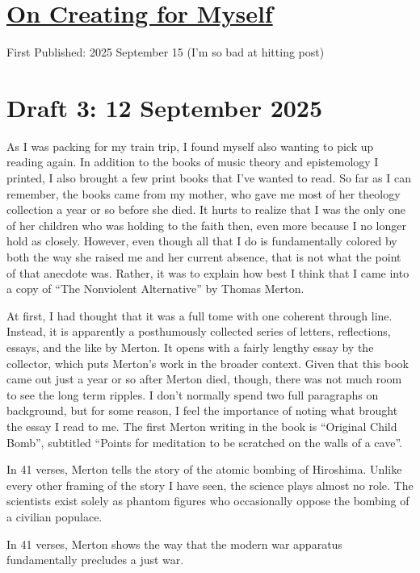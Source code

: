 \documentclass[12pt]{article}
\newcommand{\say}[1]{``#1''}
\renewcommand{\,}{\textsuperscript{,}}
\begin{document}
  
\doublespacing  
\section{\href{creating-for-myself.html}{On Creating for Myself}}  
First Published: 2025 September 15 (I'm so bad at hitting post)

\section{Draft 3: 12 September 2025}

As I was packing for my train trip, I found myself also wanting to pick up reading again.
In addition to the books of music theory and epistemology I printed, I also brought a few print books that I've wanted to read.
So far as I can remember, the books came from my mother, who gave me most of her theology collection a year or so before she died.
It hurts to realize that I was the only one of her children who was holding to the faith then, even more because I no longer hold as closely.
However, even though all that I do is fundamentally colored by both the way she raised me and her current absence, that is not what the point of that anecdote was.
Rather, it was to explain how best I think that I came into a copy of \say{The Nonviolent Alternative} by Thomas Merton.

At first, I had thought that it was a full tome with one coherent through line.
Instead, it is apparently a posthumously collected series of letters, reflections, essays, and the like by Merton.
It opens with a fairly lengthy essay by the collector, which puts Merton's work in the broader context.
Given that this book came out just a year or so after Merton died, though, there was not much room to see the long term ripples.
I don't normally spend two full paragraphs on background, but for some reason, I feel the importance of noting what brought the essay I read to me.
The first Merton writing in the book is \say{Original Child Bomb}, subtitled \say{Points for meditation to be scratched on the walls of a cave}.

In 41 verses, Merton tells the story of the atomic bombing of Hiroshima.
Unlike every other framing of the story I have seen, the science plays almost no role.
The scientists exist solely as phantom figures who occasionally oppose the bombing of a civilian populace.

In 41 verses, Merton shows the way that the modern war apparatus fundamentally precludes a just war.
\end{document}
